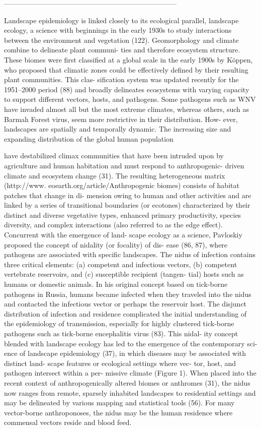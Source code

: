 --------------------------------------------------------------------------



Landscape epidemiology is linked closely
to its ecological parallel, landscape ecology, a
science with beginnings in the early 1930s to
study interactions between the environment
and vegetation (122). Geomorphology and
climate combine to delineate plant communi-
ties and therefore ecosystem structure. These
biomes were first classified at a global scale in
the early 1900s by Köppen, who proposed that
climatic zones could be effectively defined by
their resulting plant communities. This clas-
sification system was updated recently for the
1951–2000 period (88) and broadly delineates
ecosystems with varying capacity to support
different vectors, hosts, and pathogens. Some
pathogens such as WNV have invaded almost
all but the most extreme climates, whereas
others, such as Barmah Forest virus, seem
more restrictive in their distribution. How-
ever, landscapes are spatially and temporally
dynamic. The increasing size and expanding
distribution of the global human population


have destabilized climax communities that have
been intruded upon by agriculture and human
habitation and must respond to anthropogenic-
driven climate and ecosystem change (31). The
resulting heterogeneous matrix (http://www.
eoearth.org/article/Anthropogenic biomes)
consists of habitat patches that change in di-
mension owing to human and other activities
and are linked by a series of transitional
boundaries (or ecotones) characterized by their
distinct and diverse vegetative types, enhanced
primary productivity, species diversity, and
complex interactions (also referred to as the
edge effect).
Concurrent with the emergence of land-
scape ecology as a science, Pavloskiy proposed
the concept of nidality (or focality) of dis-
ease (86, 87), where pathogens are associated
with specific landscapes. The nidus of infection
contains three critical elements: (a) competent
and infectious vectors, (b) competent vertebrate
reservoirs, and (c) susceptible recipient (tangen-
tial) hosts such as humans or domestic animals.
In his original concept based on tick-borne
pathogens in Russia, humans became infected
when they traveled into the nidus and contacted
the infectious vector or perhaps the reservoir
host. The disjunct distribution of infection and
residence complicated the initial understanding
of the epidemiology of transmission, especially
for highly clustered tick-borne pathogens such
as tick-borne encephalitis virus (83). This nidal-
ity concept blended with landscape ecology has
led to the emergence of the contemporary sci-
ence of landscape epidemiology (37), in which
diseases may be associated with distinct land-
scape features or ecological settings where vec-
tor, host, and pathogen intersect within a per-
missive climate (Figure 1). When placed into
the recent context of anthropogenically altered
biomes or anthromes (31), the nidus now ranges
from remote, sparsely inhabited landscapes to
residential settings and may be delineated by
various mapping and statistical tools (56). For
many vector-borne anthroponoses, the nidus
may be the human residence where commensal
vectors reside and blood feed.


